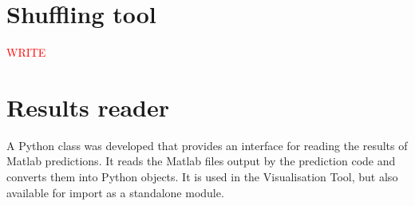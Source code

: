 \documentclass[11pt, oneside]{report}
\newcommand{\comment}[1]{\textcolor{red}{#1}}
\begin{document}
    \section{Shuffling tool}
        \comment{WRITE}
    
    \section{Results reader}
        A Python class was developed that provides an interface for reading the results of Matlab predictions. It reads the Matlab files output by the prediction code and converts them into Python objects. It is used in the Visualisation Tool, but also available for import as a standalone module.
\end{document}
